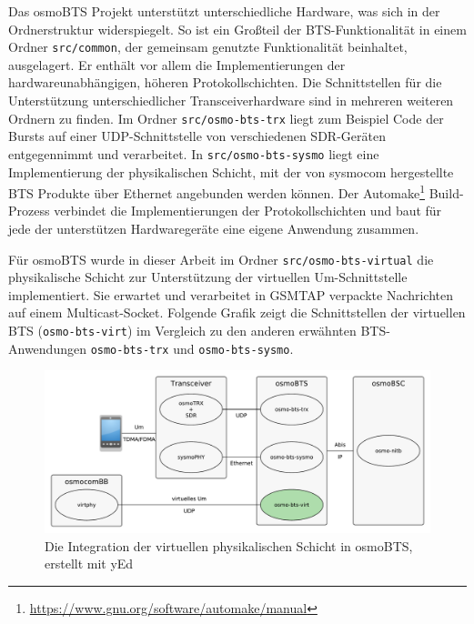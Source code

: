 Das osmoBTS Projekt unterstützt unterschiedliche Hardware, was sich in der Ordnerstruktur widerspiegelt. So ist ein Großteil der \ac{BTS}-Funktionalität in einem Ordner \texttt{src/common}, der gemeinsam genutzte Funktionalität beinhaltet, ausgelagert. Er enthält vor allem die Implementierungen der hardwareunabhängigen, höheren Protokollschichten. Die Schnittstellen für die Unterstützung unterschiedlicher Transceiverhardware sind in mehreren weiteren Ordnern zu finden. Im Ordner \texttt{src/osmo-bts-trx} liegt zum Beispiel Code der Bursts auf einer \ac{UDP}-Schnittstelle von verschiedenen \ac{SDR}-Geräten entgegennimmt und verarbeitet. In \texttt{src/osmo-bts-sysmo} liegt eine Implementierung der physikalischen Schicht, mit der von sysmocom hergestellte \ac{BTS} Produkte über Ethernet angebunden werden können. Der Automake\footnote{\url{https://www.gnu.org/software/automake/manual}} Build-Prozess verbindet die Implementierungen der Protokollschichten und baut für jede der unterstützen Hardwaregeräte eine eigene Anwendung zusammen.

Für osmoBTS wurde in dieser Arbeit im Ordner \texttt{src/osmo-bts-virtual} die physikalische Schicht zur Unterstützung der virtuellen \ac{Um}-Schnittstelle implementiert. Sie erwartet und verarbeitet in \ac{GSMTAP} verpackte Nachrichten auf einem Multicast-Socket. Folgende Grafik zeigt die Schnittstellen der virtuellen \ac{BTS} (\texttt{osmo-bts-virt}) im Vergleich zu den anderen erwähnten \ac{BTS}-Anwendungen \texttt{osmo-bts-trx} und \texttt{osmo-bts-sysmo}.

\begin{figure}[H]
	\centering \includegraphics[width=1.0\linewidth]{figures/virt-bts-in-osmocom.pdf}
	\caption[Die Integration der virtuellen physikalischen Schicht in osmoBTS]{Die Integration der virtuellen physikalischen Schicht in osmoBTS, erstellt mit yEd} \label{fig:virt-bts-in-osmocom}
\end{figure}

